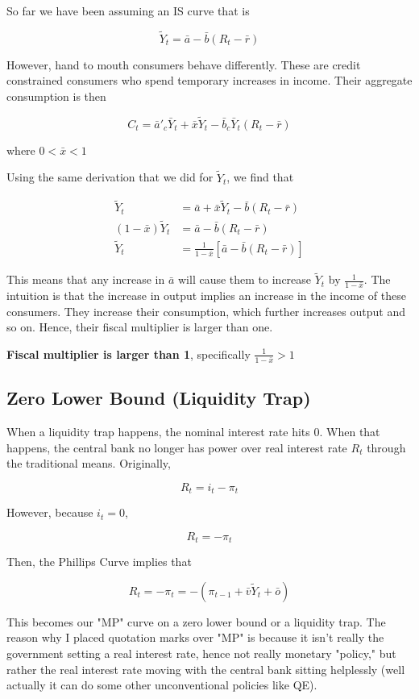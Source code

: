 \documentclass[11pt]{scrartcl}
\newcommand{\og}{\ensuremath{\tilde{Y}}}
\begin{document}
So far we have been assuming an IS curve that is 

\[\og_t = \bar{a} - \bar{b} (R_t -\bar{r}) \]

However, hand to mouth consumers behave differently. These are credit constrained consumers who spend temporary increases in income. Their aggregate consumption is then

\[C_t = \bar{a}'_c \bar{Y}_t +\bar{x}\og_t - \bar{b}_c \bar{Y}_t (R_t - \bar{r}) \]

where $ 0 < \bar{x} < 1$

Using the same derivation that we did for $\og_t$, we find that

\begin{align*}
\og_t &= \bar{a} + \bar{x}\og_t - \bar{b} (R_t - \bar{r})\\ 
(1-\bar{x}) \og_t &= \bar{a} - \bar{b} (R_t - \bar{r}) \\
\og_t &= \frac{1}{1-\bar{x}}[\bar{a} - \bar{b}(R_t - \bar{r})]
\end{align*}

This means that any increase in $\bar{a}$ will cause them to increase $\og_t$ by $\frac{1}{1-\bar{x}}$. The intuition is that the increase in output implies an increase in the income of these consumers. They increase their consumption, which further increases output and so on. Hence, their fiscal multiplier is larger than one.

\textbf{Fiscal multiplier is larger than 1}, specifically $\frac{1}{1-\bar{x}} > 1$

\subsection{Zero Lower Bound (Liquidity Trap)}

When a liquidity trap happens, the nominal interest rate hits 0. When that happens, the central bank no longer has power over real interest rate $R_t$ through the traditional means. Originally, 

\[ R_t = i_t - \pi_t \]

However, because $i_t = 0$,

\[ R_t = -\pi_t \]

Then, the Phillips Curve implies that 

\[ R_t = -\pi_t = -(\pi_{t-1} + \bar{v}\og_t + \bar{o}) \]

This becomes our "MP" curve on a zero lower bound or a liquidity trap. The reason why I placed quotation marks over "MP" is because it isn't really the government setting a real interest rate, hence not really monetary "policy," but rather the real interest rate moving with the central bank sitting helplessly (well actually it can do some other unconventional policies like QE).
\end{document}
